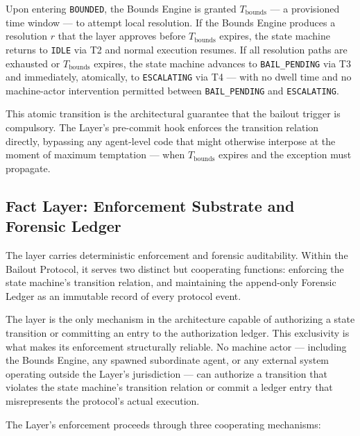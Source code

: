Upon entering \texttt{BOUNDED}, the Bounds Engine is granted $T_{\text{bounds}}$ --- a provisioned time window --- to attempt local resolution. If the Bounds Engine produces a resolution $r$ that the \fact{} layer approves before $T_{\text{bounds}}$ expires, the state machine returns to \texttt{IDLE} via T2 and normal execution resumes. If all resolution paths are exhausted or $T_{\text{bounds}}$ expires, the state machine advances to \texttt{BAIL\_PENDING} via T3 and immediately, atomically, to \texttt{ESCALATING} via T4 --- with no dwell time and no machine-actor intervention permitted between \texttt{BAIL\_PENDING} and \texttt{ESCALATING}.

This atomic transition is the architectural guarantee that the bailout trigger is compulsory. The \fact{} Layer's pre-commit hook enforces the transition relation directly, bypassing any agent-level code that might otherwise interpose at the moment of maximum temptation --- when $T_{\text{bounds}}$ expires and the exception must propagate.

\subsection{Fact Layer: Enforcement Substrate and Forensic Ledger}\label{sec:bailout-fact}

The \fact{} layer carries deterministic enforcement and forensic auditability. Within the Bailout Protocol, it serves two distinct but cooperating functions: enforcing the state machine's transition relation, and maintaining the append-only Forensic Ledger as an immutable record of every protocol event.

The \fact{} layer is the only mechanism in the \bxthree{} architecture capable of authorizing a state transition or committing an entry to the authorization ledger. This exclusivity is what makes its enforcement structurally reliable. No machine actor --- including the Bounds Engine, any spawned subordinate agent, or any external system operating outside the \fact{} Layer's jurisdiction --- can authorize a transition that violates the state machine's transition relation or commit a ledger entry that misrepresents the protocol's actual execution.

The \fact{} Layer's enforcement proceeds through three cooperating mechanisms:

